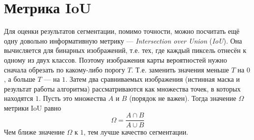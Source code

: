 \section*{Метрика IoU}
Для оценки результатов сегментации, помимо точности, можно посчитать ещё одну
довольно информативную метрику --- \textit{Intersection over Union}
(\textit{IoU}). Она вычисляется для бинарных изображений, т.е. тех, где каждый
пиксель отнесён к одному из двух классов. Поэтому изображения карты вероятностей
нужно сначала обрезать по какому-либо порогу $T$. Т.е. заменить значения меньше
$T$ на $0$, а больше $T$ --- на $1$. Затем два сравниваемых изображения
(истинная маска и результат работы алгоритма) рассматриваются как множества
точек, в которых находятся $1$. Пусть это множества $A$ и $B$ (порядок не
важен). Тогда значение $\Omega$ метрики IoU равно
$$
\Omega = \frac{A \cap B}{A \cup B}
$$
Чем ближе значение $\Omega$ к $1$, тем лучше качество сегментации.
